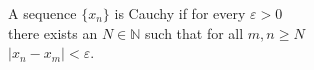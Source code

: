 \documentclass[preview]{standalone}
\begin{document}
\begin{center}
A sequence $\{x_n\}$ is Cauchy if for every $\varepsilon > 0$\\there exists an $N \in \mathbb{N}$ such that for all $m, n \geq N$\\$\left| x_n - x_m \right| < \varepsilon$.
\end{center}
\end{document}
